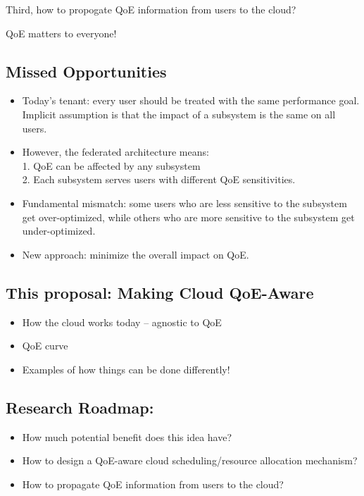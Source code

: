 Third, how to propogate QoE information from users to the cloud?






QoE matters to everyone!

\subsection{Missed Opportunities}
\begin{itemize}

\item Today's tenant: every user should be treated with the same performance goal. Implicit assumption is that the impact of a subsystem is the same on all users.

\item However, the federated architecture means:\\
1. QoE can be affected by any subsystem\\
2. Each subsystem serves users with different QoE sensitivities.

\item Fundamental mismatch: some users who are less sensitive to the subsystem get over-optimized, while others who are more sensitive to the subsystem get under-optimized.

\item New approach: minimize the overall impact on QoE. 

\end{itemize}

\subsection{This proposal: Making Cloud QoE-Aware}
\begin{itemize}

\item How the cloud works today -- agnostic to QoE

\item QoE curve

\item Examples of how things can be done differently!

\end{itemize}


\subsection{Research Roadmap:}
\begin{itemize}

\item How much potential benefit does this idea have?

\item How to design a QoE-aware cloud scheduling/resource allocation mechanism?

\item How to propagate QoE information from users to the cloud?

\end{itemize}